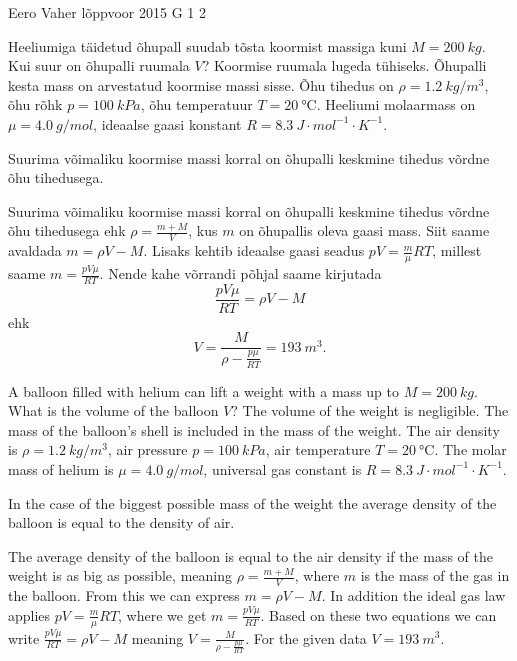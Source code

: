 {Eero Vaher} %
{lõppvoor} %
{2015} %
{G 1} %
{2} %
{
\ifStatement
Heeliumiga täidetud õhupall suudab tõsta koormist massiga kuni $M=\SI{200}{kg}$. Kui suur on õhupalli ruumala $V$? Koormise ruumala lugeda tühiseks. Õhupalli kesta mass on arvestatud koormise massi sisse. Õhu tihedus on $\rho=\SI{1.2}{kg\per m^3}$, õhu rõhk $p=\SI{100}{kPa}$, õhu temperatuur $T=\SI{20}{\celsius}$. Heeliumi molaarmass on $\mu=\SI{4.0}{g\per mol}$, ideaalse gaasi konstant $R=\SI{8.3}{J\cdot mol^{-1}\cdot K^{-1}}$.
\fi


\ifHint
Suurima võimaliku koormise massi korral on õhupalli keskmine tihedus võrdne õhu tihedusega.
\fi


\ifSolution
Suurima võimaliku koormise massi korral on õhupalli keskmine tihedus võrdne õhu tihedusega ehk $\rho=\frac{m+M}{V}$, kus $m$ on õhupallis oleva gaasi mass. Siit saame avaldada $m=\rho V-M$. Lisaks kehtib ideaalse gaasi seadus $pV=\frac{m}{\mu}RT$, millest saame $m=\frac{pV\mu}{RT}$. Nende kahe võrrandi põhjal saame kirjutada
\[
\frac{pV\mu}{RT}=\rho V-M
\]
ehk
\[
V=\frac{M}{\rho-\frac{p\mu}{RT}}=\SI{193}{m^3}.
\]
\fi


\ifEngStatement
A balloon filled with helium can lift a weight with a mass up to $M=\SI{200}{kg}$. What is the volume of the balloon $V$? The volume of the weight is negligible. The mass of the balloon’s shell is included in the mass of the weight. The air density is $\rho=\SI{1.2}{kg\per m^3}$, air pressure $p=\SI{100}{kPa}$, air temperature $T=\SI{20}{\celsius}$. The molar mass of helium is $\mu=\SI{4.0}{g\per mol}$, universal gas constant is $R=\SI{8.3}{J\cdot mol^{-1}\cdot K^{-1}}$.
\fi


\ifEngHint
In the case of the biggest possible mass of the weight the average density of the balloon is equal to the density of air.
\fi


\ifEngSolution
The average density of the balloon is equal to the air density if the mass of the weight is as big as possible, meaning $\rho=\frac{m+M}{V}$, where $m$ is the mass of the gas in the balloon. From this we can express $m=\rho V-M$. In addition the ideal gas law applies $pV=\frac{m}{\mu}RT$, where we get $m=\frac{pV\mu}{RT}$. Based on these two equations we can write $\frac{pV\mu}{RT}=\rho V-M$ meaning $V=\frac{M}{\rho-\frac{p\mu}{RT}}$. For the given data $V=\SI{193}{m^3}$.
\fi
}